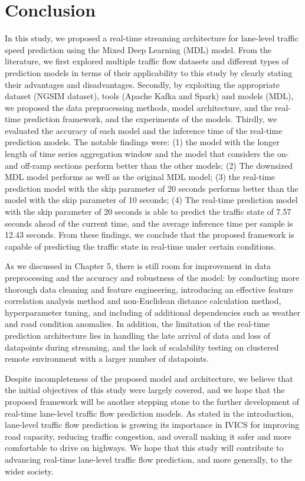 \documentclass[11pt]{uonthesis}
\begin{document}
\chapter{Conclusion}

In this study, we proposed a real-time streaming architecture for lane-level traffic speed prediction using the Mixed Deep Learning (MDL) model. From the literature, we first explored multiple traffic flow datasets and different types of prediction models in terms of their applicability to this study by clearly stating their advantages and disadvantages. Secondly, by exploiting the appropriate dataset (NGSIM dataset), tools (Apache Kafka and Spark) and models (MDL), we proposed the data preprocessing methods, model architecture, and the real-time prediction framework, and the experiments of the models. Thirdly, we evaluated the accuracy of each model and the inference time of the real-time prediction models. The notable findings were: (1) the model with the longer length of time series aggregation window and the model that considers the on- and off-ramp sections perform better than the other models; (2) The downsized MDL model performs as well as the original MDL model; (3) the real-time prediction model with the skip parameter of 20 seconds performs better than the model with the skip parameter of 10 seconds; (4) The real-time prediction model with the skip parameter of 20 seconds is able to predict the traffic state of 7.57 seconds ahead of the current time, and the average inference time per sample is 12.43 seconds. From these findings, we conclude that the proposed framework is capable of predicting the traffic state in real-time under certain conditions.

As we discussed in Chapter 5, there is still room for improvement in data preprocessing and the accuracy and robustness of the model: by conducting more thorough data cleaning and feature engineering, introducing an effective feature correlation analysis method and non-Euclidean distance calculation method, hyperparameter tuning, and including of additional dependencies such as weather and road condition anomalies. In addition, the limitation of the real-time prediction architecture lies in handling the late arrival of data and loss of datapoints during streaming, and the lack of scalability testing on clustered remote environment with a larger number of datapoints.

Despite incompleteness of the proposed model and architecture, we believe that the initial objectives of this study were largely covered, and we hope that the proposed framework will be another stepping stone to the further development of real-time lane-level traffic flow prediction models. As stated in the introduction, lane-level traffic flow prediction is growing its importance in IVICS for improving road capacity, reducing traffic congestion, and overall making it safer and more comfortable to drive on highways. We hope that this study will contribute to advancing real-time lane-level traffic flow prediction, and more generally, to the wider society.
\end{document}
